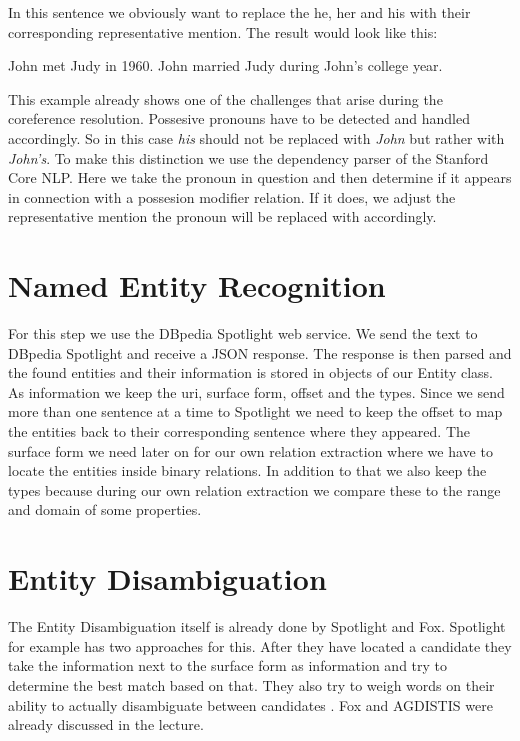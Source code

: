 \documentclass[runningheads]{llncs}
\begin{document}
In this sentence we obviously want to replace the he, her and his with their corresponding representative mention.
The result would look like this: 

\begin{example} John met Judy in 1960. John married Judy during John's college year. \end{example}


This example already shows one of the challenges that arise during the coreference resolution. Possesive pronouns have to be detected and handled accordingly. So in this case \textit{his} should not be replaced with \textit{John} but rather with \textit{John's}. To make this distinction we use the dependency parser \cite{parser} of the Stanford Core NLP. Here we take the pronoun in question and then determine if it appears in connection with a possesion modifier relation. If it does, we adjust the representative mention the pronoun will be replaced with accordingly.



\section{Named Entity Recognition}
For this step we use the DBpedia Spotlight web service. We send the text to DBpedia Spotlight and receive a JSON response. The response is then parsed and the found entities and their information is stored in objects of our Entity class. As information we keep the uri, surface form, offset and the types. Since we send more than one sentence at a time to Spotlight we need to keep the offset to map the entities back to their corresponding sentence where they appeared. The surface form we need later on for our own relation extraction where we have to locate the entities inside binary relations. In addition to that we also keep the types because during our own relation extraction we compare these to the range and domain of some properties.





\section{Entity Disambiguation}
The Entity Disambiguation itself is already done by Spotlight and Fox. Spotlight for example has two approaches for this.
After they have located a candidate they take the information next to the surface form as information and try to determine the best match based on that. They also try to weigh words on their ability to actually disambiguate between candidates \cite{disambiguate}. Fox and AGDISTIS \cite{agdistis} were already discussed in the lecture.
\end{document}
